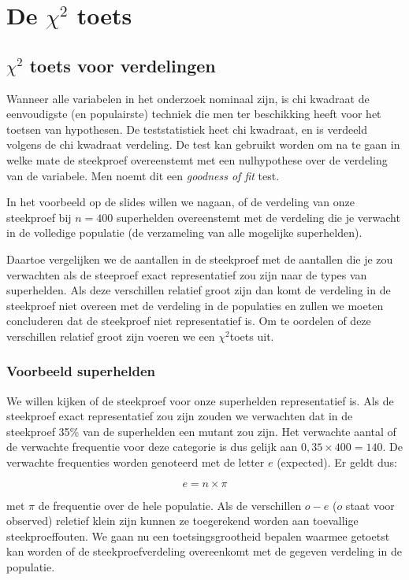 \chapter{De \texorpdfstring{$\chi^{2}$}{Chi-kwadraat} toets}
\label{ch:chikwadraat}

\section{\texorpdfstring{$\chi^{2}$}{Chi-kwadraat} toets voor verdelingen}

Wanneer alle variabelen in het onderzoek nominaal zijn, is chi kwadraat de eenvoudigste (en populairste) techniek die men ter beschikking heeft voor het toetsen van hypothesen. De teststatistiek heet chi kwadraat, en is verdeeld volgens de chi kwadraat verdeling. De test kan gebruikt worden om na te gaan in welke mate de steekproef overeenstemt met een nulhypothese over de verdeling van de variabele. Men noemt dit een \textit{goodness of fit}  test.

In het voorbeeld op de slides willen we nagaan, of de verdeling van onze steekproef bij $n = 400$ superhelden overeenstemt met de verdeling die je verwacht in de volledige populatie (de verzameling van alle mogelijke superhelden). 

Daartoe vergelijken we de aantallen in de steekproef met de aantallen die je zou verwachten als de steeproef exact representatief zou zijn naar de types van superhelden. Als deze verschillen relatief groot zijn dan komt de verdeling in de steekproef niet overeen met de verdeling in de populaties en zullen we moeten concluderen dat de steekproef niet representatief is. Om te oordelen of deze verschillen relatief groot zijn voeren we een $\chi^{2}$toets uit. 


\subsection{Voorbeeld superhelden}
We willen kijken of de steekproef voor onze superhelden representatief is. Als de steekproef exact representatief zou zijn zouden we verwachten dat in de steekproef 35\% van de superhelden een mutant zou zijn. Het verwachte aantal of de verwachte frequentie voor deze categorie is dus gelijk aan $0,35 \times 400 = 140$. De verwachte frequenties worden genoteerd met de letter $e$ (expected). Er geldt dus:

\[ e = n \times \pi \]

met $\pi$ de frequentie over de hele populatie. Als de verschillen $o - e$ ($o$ staat voor observed) reletief klein zijn kunnen ze toegerekend worden aan toevallige steekproeffouten. We gaan nu een toetsingsgrootheid bepalen waarmee getoetst kan worden of de steekproefverdeling overeenkomt met de gegeven verdeling in de populatie.

